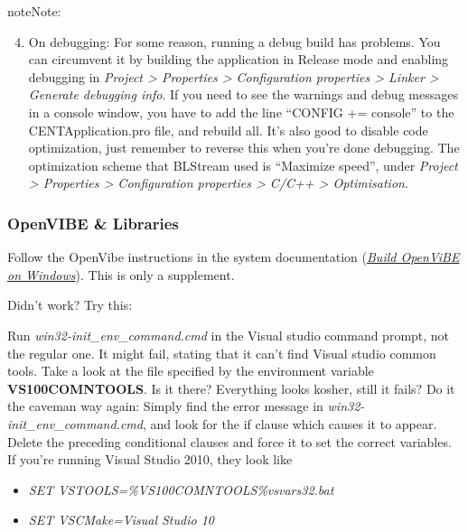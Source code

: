 \documentclass[letterpaper,10pt,english]{sphinxmanual}
\begin{document}
\begin{notice}{note}{Note:}\begin{enumerate}
\setcounter{enumi}{3}
\item {} 
On debugging: For some reason, running a debug build has problems. You can circumvent it by building the application in Release mode and enabling debugging in \emph{Project \textgreater{} Properties \textgreater{} Configuration properties \textgreater{} Linker \textgreater{} Generate debugging info}. If you need to see the warnings and debug messages in a console window, you have to add the line ``CONFIG += console'' to the CENTApplication.pro file, and rebuild all. It's also good to disable code optimization, just remember to reverse this when you're done debugging. The optimization scheme that BLStream used is ``Maximize speed'', under \emph{Project \textgreater{} Properties \textgreater{} Configuration properties \textgreater{} C/C++ \textgreater{} Optimisation}.

\end{enumerate}
\end{notice}


\subsubsection{OpenVIBE \& Libraries}
\label{index:openvibe-libraries}\label{index:ov-and-libs-build}
Follow the OpenVibe instructions in the system documentation ({\hyperref[index:build-ov]{\emph{Build OpenViBE on Windows}}}). This is only a supplement.

Didn't work? Try this:

Run \emph{win32-init\_env\_command.cmd} in the Visual studio command prompt, not the regular one. It might fail, stating that it can't find Visual studio common tools. Take a look at the file specified by the environment variable \textbf{VS100COMNTOOLS}. Is it there? Everything looks kosher, still it fails? Do it the caveman way again: Simply find the error message in \emph{win32-init\_env\_command.cmd}, and look for the if clause which causes it to appear. Delete the preceding conditional clauses and force it to set the correct variables. If you're running Visual Studio 2010, they look like
\begin{itemize}
\item {} 
\emph{SET VSTOOLS=\%VS100COMNTOOLS\%vsvars32.bat}

\item {} 
\emph{SET VSCMake=Visual Studio 10}

\end{itemize}
\end{document}
